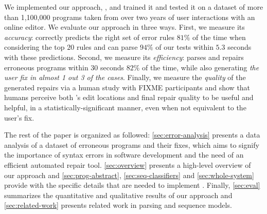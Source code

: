 We implemented our approach, \toolname, and trained it and tested it on a
dataset of more than 1,100,000 programs taken from over two years of user
interactions with an online editor. We evaluate our approach in three ways.
%
First, we measure its \emph{accuracy}: \toolname correctly predicts
the right set of error rules $81\%$ of the time when considering the top $20$
rules and can parse $94\%$ of our tests within $5.3$ seconds with these
predictions.
%
Second, we measure its \emph{efficiency}: \toolname
parses and repairs erroneous programs within $30$ seconds $82\%$ of the time,
while also generating \emph{the user fix in almost 1 out 3 of the cases}.
%
Finally, we measure the \emph{quality} of the generated repairs via a human study
with FIXME participants and show that humans perceive both \toolname's edit
locations and final repair quality to be useful and helpful,
in a statistically-significant manner, even when not equivalent to the user's fix.


The rest of the paper is organized as followed: \autoref{sec:error-analysis}
presents a data analysis of a \python dataset of erroneous programs and their
fixes, which aims to signify the importance of syntax errors in software
development and the need of an efficient automated repair tool.
\autoref{sec:overview} presents a high-level overview of our approach and
\autoref{sec:prog-abstract}, \autoref{sec:seq-classifiers} and
\autoref{sec:whole-system} provide with the specific details that are needed to
implement \toolname. Finally, \autoref{sec:eval} summarizes the quantitative and
qualitative results of our approach and \autoref{sec:related-work} presents
related work in parsing and sequence models.
